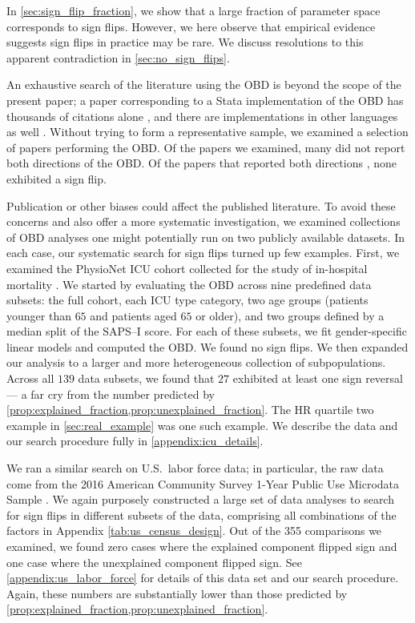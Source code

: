 In \cref{sec:sign_flip_fraction}, we show that a large fraction of parameter space corresponds to sign flips.
However, we here observe that empirical evidence suggests sign flips in practice may be rare.
We discuss resolutions to this apparent contradiction in \cref{sec:no_sign_flips}.

An exhaustive search of the literature using the OBD is beyond the scope of the present paper;
a paper corresponding to a Stata implementation of the OBD has thousands of citations alone \citep{jann2008}, and there are implementations
in other languages as well \citep{Hlavac2022oaxaca}.
Without trying to form a representative sample, we examined a selection of papers performing the OBD. 
Of the papers we examined, many did not report both directions of the OBD.
Of the papers that reported both directions \citep{ONeill2006, fortinLemieuxFirpo2011, sharafRashad2016, rahimiNazari2021},
none exhibited a sign flip.

Publication or other biases could affect the published literature. To avoid these concerns and also offer a more systematic investigation,
we examined collections
of OBD analyses one might potentially run on two publicly available datasets. 
In each case, our systematic search for sign flips turned up few examples.
First, we examined the PhysioNet ICU cohort collected for the study of in-hospital mortality \citep{goldberger2000physiobank}.
We started by evaluating the OBD across nine predefined data subsets: the full cohort, each ICU type category, two age groups (patients younger than $65$ and patients aged $65$ or older), and two groups defined by a median split of the SAPS--I score. For each of these subsets, we fit gender-specific linear models and computed the OBD. 
We found no sign flips.
We then expanded our analysis to a larger and more heterogeneous collection of subpopulations.
Across all $139$ data subsets, we found that $27$ exhibited at least one sign reversal --- a far cry from the number predicted by \cref{prop:explained_fraction,prop:unexplained_fraction}.
The HR quartile two example in \cref{sec:real_example} was one such example. We describe the data and our search procedure fully in 
\cref{appendix:icu_details}.

We ran a similar search on U.S.\ labor force data; in particular,
the raw data come from the 2016 American Community Survey 1-Year Public Use Microdata Sample \cite{uscensus_acs_pums_2016}.
We again purposely constructed a large set of data analyses to search for sign flips in different subsets of the data, comprising all combinations of the factors in Appendix \cref{tab:us_census_design}.
Out of the 355 comparisons we examined, we found zero cases where the explained component flipped sign and one case where the unexplained component flipped sign.
See \cref{appendix:us_labor_force} for details of this data set and our search procedure.
Again, these numbers are substantially lower than those predicted by \cref{prop:explained_fraction,prop:unexplained_fraction}.

